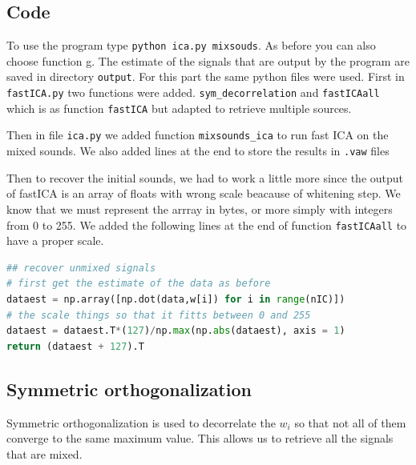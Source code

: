 \documentclass[10pt,a4paper]{article}
\begin{document}
\subsection{Code}
To use the program type \texttt{python ica.py mixsouds}. As before you can also choose function g. The estimate of the signals that are output by the program are saved in directory \texttt{output}.
For this part the same python files were used. First in \texttt{fastICA.py} two functions were added. \texttt{sym\_decorrelation} and \texttt{fastICAall} which is 
as function \texttt{fastICA} but adapted to retrieve multiple sources.

Then in file \texttt{ica.py} we added function \texttt{mixsounds\_ica} to run fast ICA on the mixed sounds. We also added lines at the end to store the results in
\texttt{.vaw} files

Then to recover the initial sounds, we had to work a little more since the output of fastICA is an array of floats with wrong scale beacause of whitening step. We know that we must represent the arrray in bytes, or more simply with integers from 0 to 255.
We added the following lines at the end of function \texttt{fastICAall} to have a proper scale.

\begin{lstlisting}[language=python,frame=single]
## recover unmixed signals
# first get the estimate of the data as before 
dataest = np.array([np.dot(data,w[i]) for i in range(nIC)])
# the scale things so that it fitts between 0 and 255
dataest = dataest.T*(127)/np.max(np.abs(dataest), axis = 1)
return (dataest + 127).T
\end{lstlisting}

\subsection{Symmetric orthogonalization}
Symmetric orthogonalization is used to decorrelate the $w_i$ so that not all of them converge to the same maximum value. This allows us to retrieve all the signals that are mixed.
\end{document}
